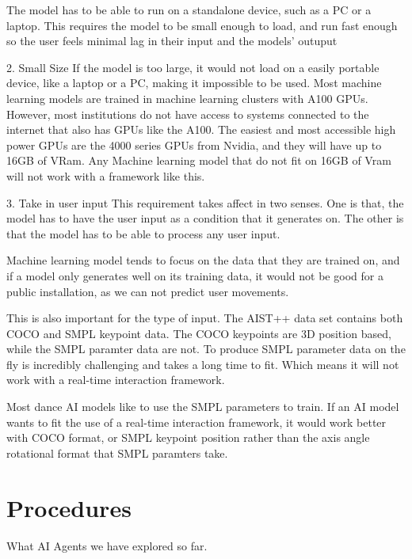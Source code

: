 \documentclass[final,5p,times,authoryear]{article}
\begin{document}
The model has to be able to run on a standalone device, such as a PC or a
laptop. This requires the model to be small enough to load, and run fast enough
so the user feels minimal lag in their input and the models' outuput

2. Small Size
If the model is too large, it would not load on a easily portable device, like a
laptop or a PC, making it impossible to be used. Most machine learning models are
trained in machine learning clusters with A100 GPUs. However, most institutions do
not have access to systems connected to the internet that also has GPUs like the A100.
The easiest and most accessible high power GPUs are the 4000 series GPUs from
Nvidia, and they will have up to 16GB of VRam. Any Machine learning model that do not
fit on 16GB of Vram will not work with a framework like this.

3. Take in user input
This requirement takes affect in two senses. One is that, the model has to have
the user input as a condition that it generates on. The other is that the model
has to be able to process any user input.

Machine learning model tends to focus on the data that they are trained on, and
if a model only generates well on its training data, it would not be good for a
public installation, as we can not predict user movements.

This is also important for the type of input. The AIST++ data set contains both COCO
and SMPL keypoint data. The COCO keypoints are 3D position based, while the SMPL paramter
data are not. To produce SMPL parameter data on the fly is incredibly challenging and takes a long time to fit. Which means it will not work with a real-time interaction framework.

Most dance AI models like to use the SMPL parameters to train. If an AI model wants to fit
the use of a real-time interaction framework, it would work better with COCO format, or SMPL
keypoint position rather than the axis angle rotational format that SMPL paramters take.

\section{Procedures}

What AI Agents we have explored so far.
\end{document}
